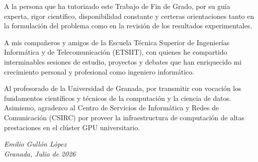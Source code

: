 A la persona que ha tutorizado este Trabajo de Fin de Grado, por su guía experta, rigor científico, disponibilidad constante y certeras orientaciones tanto en la formulación del problema como en la revisión de los resultados experimentales.

A mis compañeros y amigos de la Escuela Técnica Superior de Ingenierías Informática y de Telecomunicación (ETSIIT), con quienes he compartido interminables sesiones de estudio, proyectos y debates que han enriquecido mi crecimiento personal y profesional como ingeniero informático.

Al profesorado de la Universidad de Granada, por transmitir con vocación los fundamentos científicos y técnicos de la computación y la ciencia de datos. Asimismo, agradezco al Centro de Servicios de Informática y Redes de Comunicación (CSIRC) por proveer la infraestructura de computación de altas prestaciones en el clúster GPU universitario.

\vspace{1cm}
\begin{flushright}
    \emph{Emilio Gullón López}\\
    \emph{Granada, Julio de 2026}
\end{flushright}

\cleardoublepage

\tableofcontents
\cleardoublepage

\listoffigures
\cleardoublepage

\listoftables
\cleardoublepage
